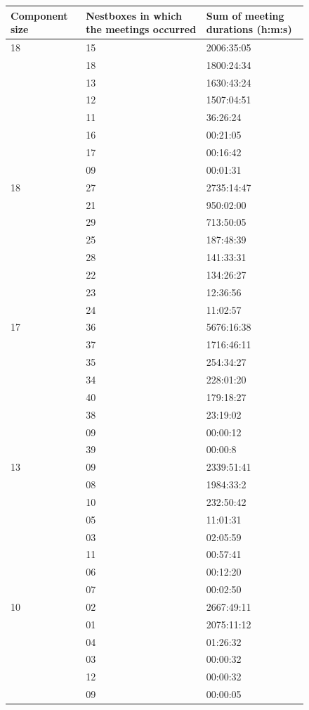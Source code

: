 \begin{figure}[p]
\begin{center}
\begin{tabular}{lll}
\toprule
\textbf{Component size} &	\textbf{Nestboxes in which the meetings occurred}	&	\textbf{Sum of meeting durations (h:m:s)} \\\midrule
18	& 15	& 2006:35:05 \\
 	& 18	& 1800:24:34 \\
	& 13	& 1630:43:24 \\
	& 12	& 1507:04:51 \\
	& 11	& 36:26:24 \\
	& 16	& 00:21:05 \\
	& 17	& 00:16:42 \\
	& 09	& 00:01:31 \\\midrule

18	& 27	& 2735:14:47 \\
	& 21	& 950:02:00 \\
	& 29	& 713:50:05 \\
	& 25	& 187:48:39 \\
	& 28	& 141:33:31 \\
	& 22	& 134:26:27 \\
	& 23 	& 12:36:56 \\
	& 24	& 11:02:57 \\\midrule

17	& 36	& 5676:16:38 \\
	& 37	& 1716:46:11 \\
	& 35	& 254:34:27 \\
	& 34	& 228:01:20 \\
	& 40	& 179:18:27 \\
	& 38	& 23:19:02 \\
	& 09	& 00:00:12 \\
	& 39	& 00:00:8 \\\midrule

13	& 09	& 2339:51:41 \\
	& 08 	& 1984:33:2 \\
	& 10	& 232:50:42 \\
	& 05	& 11:01:31 \\
	& 03 	& 02:05:59 \\
	& 11 	& 00:57:41 \\
	& 06	& 00:12:20 \\
	& 07	& 00:02:50 \\\midrule
	
10	& 02	& 2667:49:11 \\
	& 01	& 2075:11:12 \\
	& 04	& 01:26:32 \\
	& 03	& 00:00:32 \\
	& 12	& 00:00:32 \\
	& 09	& 00:00:05 \\\midrule


\end{tabular}
\end{center}
\end{figure}
